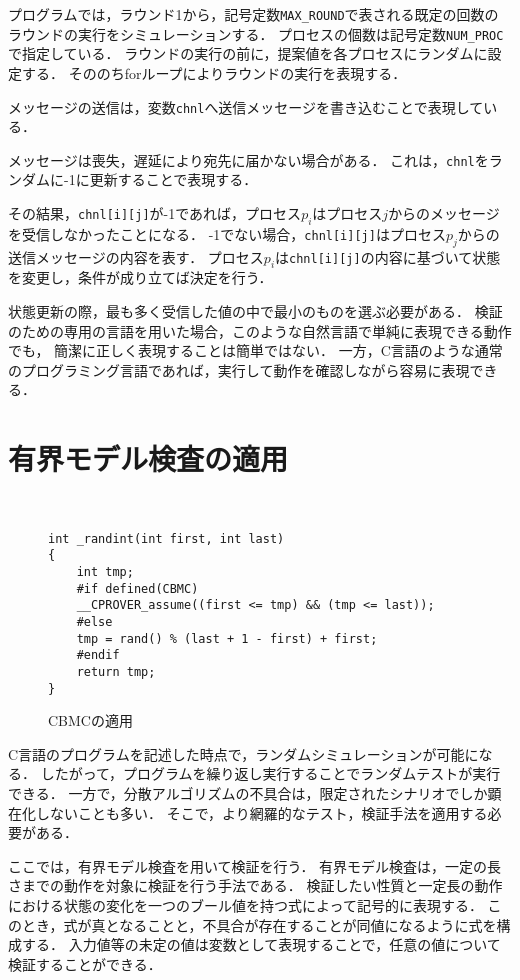 \documentclass[technicalreport]{ieicej}
\theoremstyle{plain}
\begin{document}
プログラムでは，ラウンド1から，記号定数\verb|MAX_ROUND|で表される既定の回数のラウンドの実行をシミュレーションする．
プロセスの個数は記号定数\verb|NUM_PROC|で指定している．
ラウンドの実行の前に，提案値を各プロセスにランダムに設定する．
そののちforループによりラウンドの実行を表現する．

メッセージの送信は，変数\verb|chnl|へ送信メッセージを書き込むことで表現している．

メッセージは喪失，遅延により宛先に届かない場合がある．
これは，\verb|chnl|をランダムに-1に更新することで表現する．

その結果，\verb|chnl[i][j]|が-1であれば，プロセス$p_i$はプロセス$j$からのメッセージを受信しなかったことになる．
-1でない場合，\verb|chnl[i][j]|はプロセス$p_j$からの送信メッセージの内容を表す．
プロセス$p_i$は\verb|chnl[i][j]|の内容に基づいて状態を変更し，条件が成り立てば決定を行う．

状態更新の際，最も多く受信した値の中で最小のものを選ぶ必要がある．
検証のための専用の言語を用いた場合，このような自然言語で単純に表現できる動作でも，
簡潔に正しく表現することは簡単ではない．
一方，C言語のような通常のプログラミング言語であれば，実行して動作を確認しながら容易に表現できる．

\section{有界モデル検査の適用}\label{sec:cmbc}
\begin{figure}[t]
    \centering　{\scriptsize
\begin{lstlisting}
int _randint(int first, int last)
{
    int tmp;
    #if defined(CBMC)
    __CPROVER_assume((first <= tmp) && (tmp <= last));
    #else
    tmp = rand() % (last + 1 - first) + first;
    #endif
    return tmp;
}
\end{lstlisting}}

        \caption{CBMCの適用}\label{fig:cbmc}
    \end{figure}          
   
C言語のプログラムを記述した時点で，ランダムシミュレーションが可能になる．
したがって，プログラムを繰り返し実行することでランダムテストが実行できる．
一方で，分散アルゴリズムの不具合は，限定されたシナリオでしか顕在化しないことも多い．
そこで，より網羅的なテスト，検証手法を適用する必要がある．

ここでは，有界モデル検査を用いて検証を行う．
有界モデル検査は，一定の長さまでの動作を対象に検証を行う手法である．
検証したい性質と一定長の動作における状態の変化を一つのブール値を持つ式によって記号的に表現する．
このとき，式が真となることと，不具合が存在することが同値になるように式を構成する．
入力値等の未定の値は変数として表現することで，任意の値について検証することができる．
\end{document}
